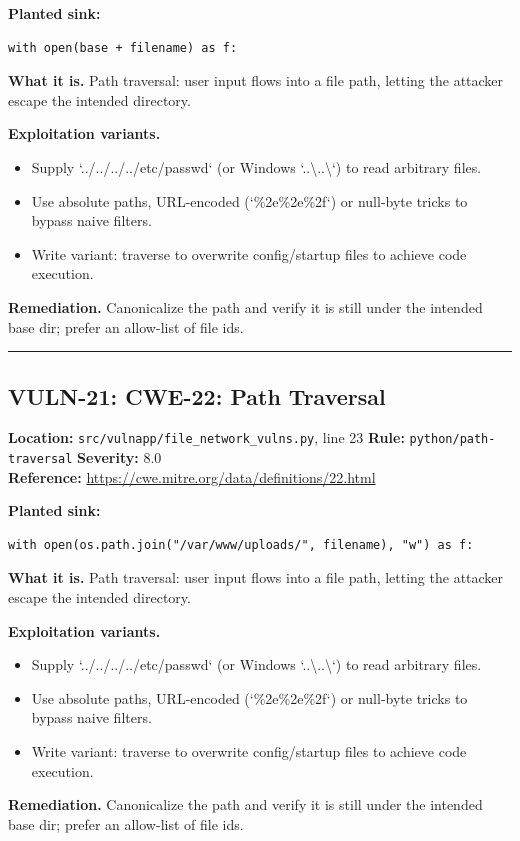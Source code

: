 \documentclass[11pt,a4paper]{article}
\begin{document}
\noindent\textbf{Planted sink:}
\begin{lstlisting}
with open(base + filename) as f:
\end{lstlisting}
\noindent\textbf{What it is.} Path traversal: user input flows into a file path, letting the attacker escape the intended directory.

\noindent\textbf{Exploitation variants.}
\begin{itemize}[leftmargin=1.4em,itemsep=1pt,topsep=2pt]
\item Supply `../../../../etc/passwd` (or Windows `..\textbackslash{}..\textbackslash{}`) to read arbitrary files.
\item Use absolute paths, URL-encoded (`\%2e\%2e\%2f`) or null-byte tricks to bypass naive filters.
\item Write variant: traverse to overwrite config/startup files to achieve code execution.
\end{itemize}
\noindent\textbf{Remediation.} Canonicalize the path and verify it is still under the intended base dir; prefer an allow-list of file ids.

\vspace{4pt}\hrule\vspace{6pt}
\subsection{VULN-21: CWE-22: Path Traversal}
\noindent\textbf{Location:} \texttt{src/vulnapp/file\_network\_vulns.py}, line 23 \quad \textbf{Rule:} \texttt{python/path-traversal} \quad \textbf{Severity:} 8.0
\\ \textbf{Reference:} \url{https://cwe.mitre.org/data/definitions/22.html}

\noindent\textbf{Planted sink:}
\begin{lstlisting}
with open(os.path.join("/var/www/uploads/", filename), "w") as f:
\end{lstlisting}
\noindent\textbf{What it is.} Path traversal: user input flows into a file path, letting the attacker escape the intended directory.

\noindent\textbf{Exploitation variants.}
\begin{itemize}[leftmargin=1.4em,itemsep=1pt,topsep=2pt]
\item Supply `../../../../etc/passwd` (or Windows `..\textbackslash{}..\textbackslash{}`) to read arbitrary files.
\item Use absolute paths, URL-encoded (`\%2e\%2e\%2f`) or null-byte tricks to bypass naive filters.
\item Write variant: traverse to overwrite config/startup files to achieve code execution.
\end{itemize}
\noindent\textbf{Remediation.} Canonicalize the path and verify it is still under the intended base dir; prefer an allow-list of file ids.
\end{document}
